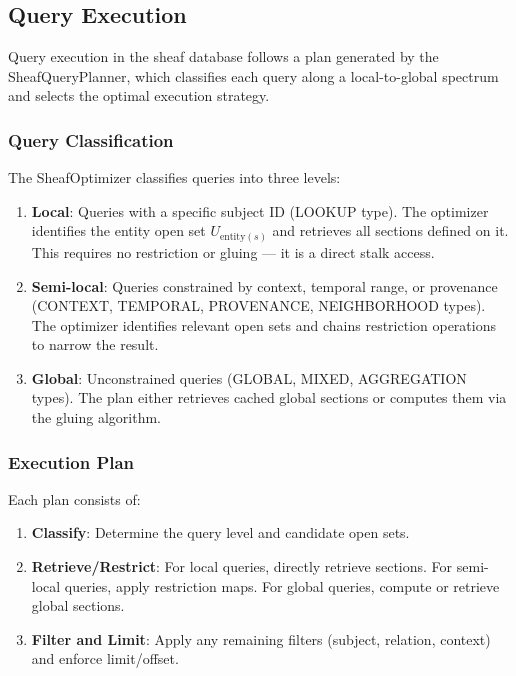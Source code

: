 
\subsection{Query Execution}

Query execution in the sheaf database follows a plan generated by the SheafQueryPlanner, which classifies each query along a local-to-global spectrum and selects the optimal execution strategy.

\subsubsection{Query Classification}

The SheafOptimizer classifies queries into three levels:

\begin{enumerate}
    \item \textbf{Local}: Queries with a specific subject ID (LOOKUP type). The optimizer identifies the entity open set $U_{\text{entity}(s)}$ and retrieves all sections defined on it. This requires no restriction or gluing — it is a direct stalk access.

    \item \textbf{Semi-local}: Queries constrained by context, temporal range, or provenance (CONTEXT, TEMPORAL, PROVENANCE, NEIGHBORHOOD types). The optimizer identifies relevant open sets and chains restriction operations to narrow the result.

    \item \textbf{Global}: Unconstrained queries (GLOBAL, MIXED, AGGREGATION types). The plan either retrieves cached global sections or computes them via the gluing algorithm.
\end{enumerate}

\subsubsection{Execution Plan}

Each plan consists of:

\begin{enumerate}
    \item \textbf{Classify}: Determine the query level and candidate open sets.
    \item \textbf{Retrieve/Restrict}: For local queries, directly retrieve sections. For semi-local queries, apply restriction maps. For global queries, compute or retrieve global sections.
    \item \textbf{Filter and Limit}: Apply any remaining filters (subject, relation, context) and enforce limit/offset.
\end{enumerate}

